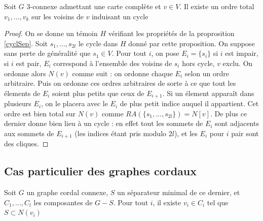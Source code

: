 \documentclass{scrartcl}
\begin{document}
\begin{flushleft}
\begin{cor}\label{ordCycl}
    Soit $G$ $3$-connexe admettant une carte complète et $v \in V$. Il existe un ordre total $v_1, ..., v_k$ sur les voisins de $v$
    induisant un cycle
\end{cor}

\begin{proof}
    On se donne un témoin $H$ vérifiant les propriétés de la proprosition \ref{cyclSep}. Soit $s_1, ..., s_{2l}$ le cycle dans $H$
    donné par cette proposition. On suppose sans perte de généralité que $s_1 \in V$. Pour tout $i$, on pose $E_i = \{s_i\}$
    si $i$ est impair, si $i$ est pair, $E_i$ correspond à l'ensemble des voisins de $s_i$ hors cycle, $v$ exclu. On ordonne alors $N(v)$
    comme suit : on ordonne chaque $E_i$ selon un ordre arbitraire. Puis on ordonne ces ordres arbitraires de sorte à ce que
    tout les élements de $E_i$ soient plus petits que ceux de $E_{i+1}$. Si un élement apparaît dans plusieurs $E_i$, on le placera avec
    le $E_i$ de plus petit indice auquel il appartient. Cet ordre est bien total sur $N(v)$
    comme $RA(\{s_1, ..., s_{2l}\}) = N[v]$. De plus ce dernier donne bien lieu à un cycle : en effet tout les sommets de $E_i$ sont
    adjacents aux sommets de $E_{i+1}$ (les indices étant pris modulo $2l$), et les $E_i$ pour $i$ pair sont des cliques.
\end{proof}

\subsection{Cas particulier des graphes cordaux}

\begin{lem}
    Soit $G$ un graphe cordal connexe, $S$ un séparateur minimal de ce dernier, et $C_1, ..., C_l$ les composantes de $G - S$. Pour tout
    $i$, il existe $v_i \in C_i$ tel que $S \subset N(v_i)$
\end{lem}


\end{flushleft}
\end{document}
